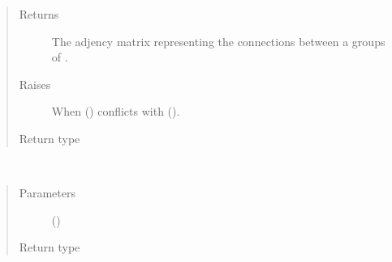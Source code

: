 \documentclass[letterpaper,10pt,english]{sphinxmanual}
\begin{document}
\begin{fulllineitems}
\begin{quote}
\begin{description}
\begin{itemize}
\end{itemize}

\item[{Returns}] \leavevmode
The adjency matrix representing the connections between a
groups of {\hyperref[\detokenize{app.domain:app.domain.network_nodes.Node}]{}}.

\item[{Raises}] \leavevmode
{\hyperref[\detokenize{app.domain.helpers:app.domain.helpers.exceptions.IllegalArgumentError}]{}} \textendash{} When  () conflicts with
     ().

\item[{Return type}] \leavevmode
{}

\end{description}\end{quote}

\end{fulllineitems}


\begin{fulllineitems}
\label{\detokenize{app.domain.helpers:app.domain.helpers.matrices.new_vector}}~\begin{quote}\begin{description}
\item[{Parameters}] \leavevmode
{} () \textendash{} 

\item[{Return type}] \leavevmode
{}

\end{description}\end{quote}

\end{fulllineitems}
\end{document}
